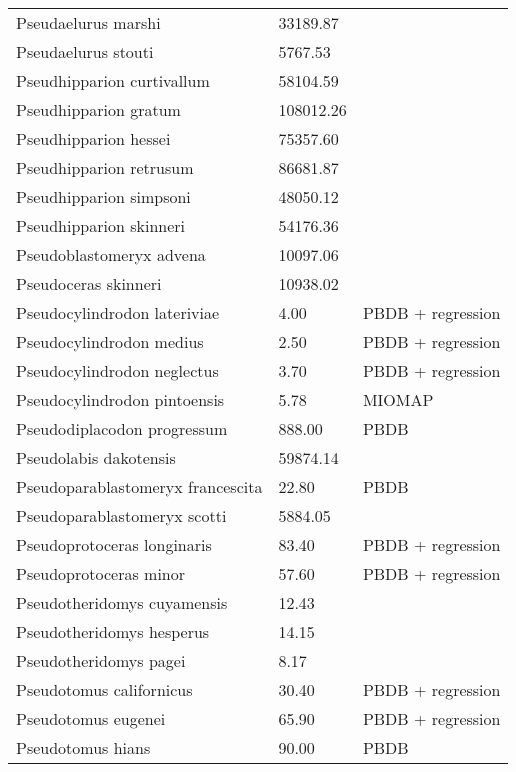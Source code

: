 \documentclass{article}
\begin{document}
\begin{center}
\begin{longtable}{p{} p{} p{}}
    Pseudaelurus marshi & 33189.87 & \cite{Tomiya2013} \\ 
    Pseudaelurus stouti & 5767.53 & \cite{Tomiya2013} \\ 
    Pseudhipparion curtivallum & 58104.59 & \cite{Tomiya2013} \\ 
    Pseudhipparion gratum & 108012.26 & \cite{Tomiya2013} \\ 
    Pseudhipparion hessei & 75357.60 & \cite{Tomiya2013} \\ 
    Pseudhipparion retrusum & 86681.87 & \cite{Tomiya2013} \\ 
    Pseudhipparion simpsoni & 48050.12 & \cite{Tomiya2013} \\ 
    Pseudhipparion skinneri & 54176.36 & \cite{Tomiya2013} \\ 
    Pseudoblastomeryx advena & 10097.06 & \cite{Tomiya2013} \\ 
    Pseudoceras skinneri & 10938.02 & \cite{Tomiya2013} \\ 
    Pseudocylindrodon lateriviae & 4.00 & PBDB + regression \\ 
    Pseudocylindrodon medius & 2.50 & PBDB + regression \\ 
    Pseudocylindrodon neglectus & 3.70 & PBDB + regression \\ 
    Pseudocylindrodon pintoensis & 5.78 & MIOMAP \\ 
    Pseudodiplacodon progressum & 888.00 & PBDB \\ 
    Pseudolabis dakotensis & 59874.14 & \cite{Tomiya2013} \\ 
    Pseudoparablastomeryx francescita & 22.80 & PBDB \\ 
    Pseudoparablastomeryx scotti & 5884.05 & \cite{Tomiya2013} \\ 
    Pseudoprotoceras longinaris & 83.40 & PBDB + regression \\ 
    Pseudoprotoceras minor & 57.60 & PBDB + regression \\ 
    Pseudotheridomys cuyamensis & 12.43 & \cite{Tomiya2013} \\ 
    Pseudotheridomys hesperus & 14.15 & \cite{Tomiya2013} \\ 
    Pseudotheridomys pagei & 8.17 & \cite{Tomiya2013} \\ 
    Pseudotomus californicus & 30.40 & PBDB + regression \\ 
    Pseudotomus eugenei & 65.90 & PBDB + regression \\ 
    Pseudotomus hians & 90.00 & PBDB \\ 

\end{longtable}
\end{center}
\end{document}
